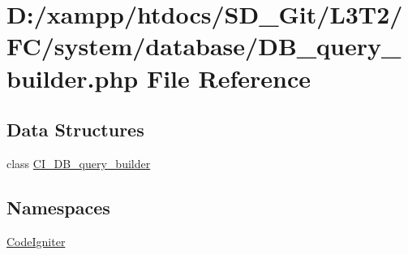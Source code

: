 \hypertarget{_d_b__query__builder_8php}{}\section{D\+:/xampp/htdocs/\+S\+D\+\_\+\+Git/\+L3\+T2/\+F\+C/system/database/\+D\+B\+\_\+query\+\_\+builder.php File Reference}
\label{_d_b__query__builder_8php}
\subsection*{Data Structures}
\begin{DoxyCompactItemize}
\item 
class \hyperlink{class_c_i___d_b__query__builder}{C\+I\+\_\+\+D\+B\+\_\+query\+\_\+builder}
\end{DoxyCompactItemize}
\subsection*{Namespaces}
\begin{DoxyCompactItemize}
\item 
 \hyperlink{namespace_code_igniter}{Code\+Igniter}
\end{DoxyCompactItemize}
